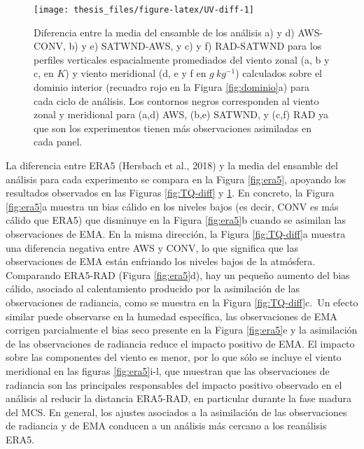 \documentclass[12pt,oneside,a4paper]{reedthesis}
\begin{document}
\begin{figure}

{\centering \texttt{[image: thesis\_files/figure-latex/UV-diff-1]} 

}

\caption{Diferencia entre la media del ensamble de los análisis a) y d) AWS-CONV, b) y e) SATWND-AWS, y c) y f) RAD-SATWND para los perfiles verticales espacialmente promediados del viento zonal (a, b y c, en \(K\)) y viento meridional (d, e y f en \(g\ kg^{-1}\)) calculados sobre el dominio interior (recuadro rojo en la Figura \ref{fig:dominio}a) para cada ciclo de análisis. Los contornos negros corresponden al viento zonal y meridional para (a,d) AWS, (b,e) SATWND, y (c,f) RAD ya que son los experimentos tienen más observaciones asimiladas en cada panel.}\label{fig:UV-diff}
\end{figure}
La diferencia entre ERA5 (Hersbach et al., 2018) y la media del ensamble del análisis para cada experimento se compara en la Figura \ref{fig:era5}, apoyando los resultados observados en las Figuras \ref{fig:TQ-diff} y \ref{fig:UV-diff}. En concreto, la Figura \ref{fig:era5}a muestra un bias cálido en los niveles bajos (es decir, CONV es más cálido que ERA5) que disminuye en la Figura \ref{fig:era5}b cuando se asimilan las observaciones de EMA. En la misma dirección, la Figura \ref{fig:TQ-diff}a muestra una diferencia negativa entre AWS y CONV, lo que significa que las observaciones de EMA están enfriando los niveles bajos de la atmósfera. Comparando ERA5-RAD (Figura \ref{fig:era5}d), hay un pequeño aumento del bias cálido, asociado al calentamiento producido por la asimilación de las observaciones de radiancia, como se muestra en la Figura \ref{fig:TQ-diff}c.~Un efecto similar puede observarse en la humedad específica, las observaciones de EMA corrigen parcialmente el bias seco presente en la Figura \ref{fig:era5}e y la asimilación de las observaciones de radiancia reduce el impacto positivo de EMA. El impacto sobre las componentes del viento es menor, por lo que sólo se incluye el viento meridional en las figuras \ref{fig:era5}i-l, que muestran que las observaciones de radiancia son las principales responsables del impacto positivo observado en el análisis al reducir la distancia ERA5-RAD, en particular durante la fase madura del MCS. En general, los ajustes asociados a la asimilación de las observaciones de radiancia y de EMA conducen a un análisis más cercano a los reanálisis ERA5.
\end{document}
